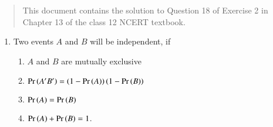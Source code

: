 \documentclass[journal,12pt,twocolumn]{IEEEtran}
\begin{document}
\begin{abstract}
    This document contains the solution to Question 18 of 
    Exercise 2 in Chapter 13 of the class 12 NCERT textbook.
\end{abstract}

\begin{enumerate}
    \item Two events $A$ and $B$ will be independent, if
    \begin{enumerate}
        \item $A$ and $B$ are mutually exclusive
        \item $\Pr\left(A'B'\right) = \left(1 - \Pr\left(A\right)\right)\left(1 - \Pr\left(B\right)\right)$
        \item $\Pr\left(A\right) = \Pr\left(B\right)$
        \item $\Pr\left(A\right) + \Pr\left(B\right) = 1$.
    \end{enumerate}


\end{enumerate}
\end{document}
